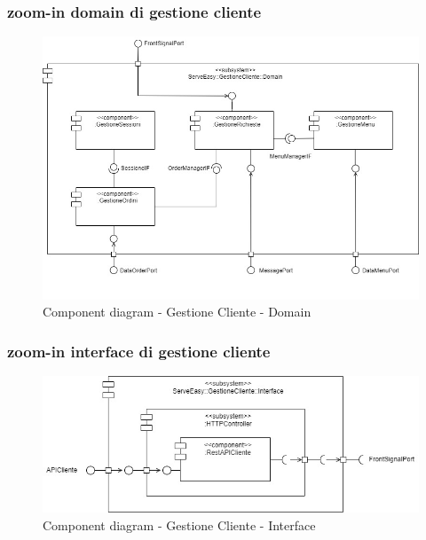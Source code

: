 \subsubsection{zoom-in domain di gestione cliente}
\begin{figure}[H]
	\centering
	\includegraphics[scale=0.5]{iterazione1/images/GestioneCliente_subsystem-Domain.jpg}
	\caption{Component diagram - Gestione Cliente - Domain \label{fig:component_diagram_gestione_cliente_domain}}
\end{figure}

\subsubsection{zoom-in interface di gestione cliente}
\begin{figure}[H]
	\centering
	\includegraphics[scale=0.5]{iterazione1/images/GestioneCliente_subsystem-Interface.jpg}
	\caption{Component diagram - Gestione Cliente - Interface \label{fig:component_diagram_gestione_cliente_interface}}
\end{figure}

\clearpage